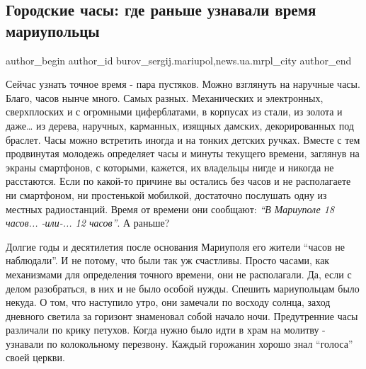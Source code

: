  
 
 
 
 
 
\subsection{Городские часы: где раньше узнавали время мариупольцы}
\label{sec:01_12_2018.stz.news.ua.mrpl_city.1.gorodskie_chasy_gde_ranshe_uznavali_vremja_mariupolcy}
 
\ifcmt
 author_begin
   author_id burov_sergij.mariupol,news.ua.mrpl_city
 author_end
\fi

Сейчас узнать точное время - пара пустяков. Можно взглянуть на наручные часы.
Благо, часов нынче много. Самых разных. Механических и электронных,
сверхплоских и с огромными циферблатами, в корпусах из стали, из золота и даже…
из дерева, наручных, карманных, изящных дамских, декорированных под браслет.
Часы можно встретить иногда и на тонких детских ручках. Вместе с тем
продвинутая молодежь определяет часы и минуты текущего времени, заглянув на
экраны смартфонов, с которыми, кажется, их владельцы нигде и никогда не
расстаются. Если по какой-то причине вы остались без часов и не располагаете ни
смартфоном, ни простенькой мобилкой, достаточно послушать одну из местных
радиостанций. Время от времени они сообщают: \emph{\enquote{В Мариуполе 18 часов... -или-...
12 часов}}. А раньше?

Долгие годы и десятилетия после основания Мариуполя его жители \enquote{часов не
наблюдали}. И не потому, что были так уж счастливы. Просто часами, как
механизмами для определения точного времени, они не располагали. Да, если с
делом разобраться, в них и не было особой нужды. Спешить мариупольцам было
некуда. О том, что наступило утро, они замечали по восходу солнца, заход
дневного светила за горизонт знаменовал собой начало ночи. Предутренние часы
различали по крику петухов. Когда нужно было идти в храм на молитву - узнавали
по колокольному перезвону. Каждый горожанин хорошо знал \enquote{голоса} своей церкви.


